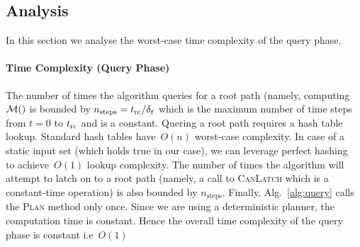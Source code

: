 \documentclass[a4paper,10pt]{article}
\begin{document}
\subsection{Analysis}

\label{para:time}
In this section we analyse the worst-case time complexity of the query phase.
\paragraph{Time Complexity (Query Phase)}
    The number of times the algorithm queries for a root path (namely, computing $\mathcal{M}()$ is bounded by $n_{\textrm{steps}} = t_{\textrm{rc}}/\delta_t$ which is the maximum number of time steps from $t = 0$ to $t_{\textrm{rc}}$ and is a constant.
Quering a root path requires a hash table lookup. Standard hash tables have~$O(n)$ worst-case complexity. In case of a static input set (which holds true in our case), we can leverage perfect hashing~\cite{czech1997perfect} to achieve~$O(1)$ lookup complexity.
    The number of times the algorithm will attempt to latch on to a root path (namely, a call to \textsc{CanLatch}  which is a constant-time operation) is also bounded by $n_{\textrm{steps}}$. Finally, Alg.~\ref{alg:query} calls the \textsc{Plan} method only once.
    Since we are using a deterministic planner, the computation time is constant.
    Hence the overall time complexity of the query phase is constant i.e~$O(1)$

%
\end{document}
